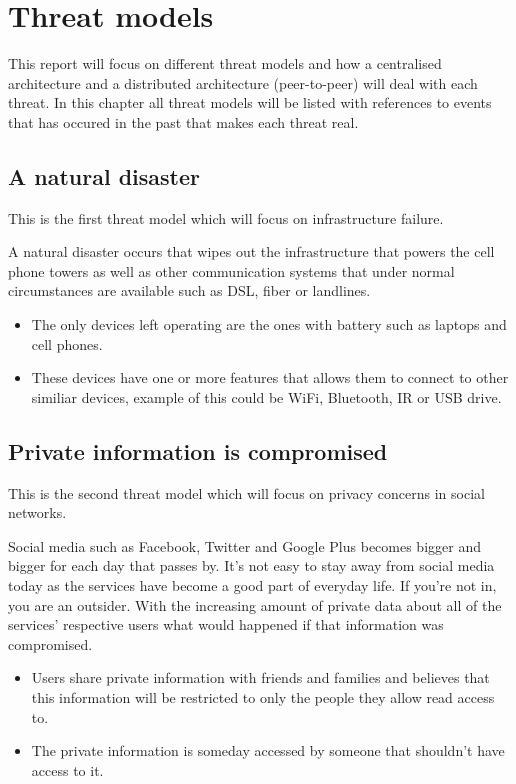 \section{Threat models}
This report will focus on different threat models and how a centralised architecture and a distributed architecture (peer-to-peer) will deal with each threat.
In this chapter all threat models will be listed with references to events that has occured in the past that makes each threat real.

\subsection{A natural disaster}
This is the first threat model which will focus on infrastructure failure.

A natural disaster occurs that wipes out the infrastructure that powers the cell phone towers as well as other communication systems that under normal circumstances are available such as DSL, fiber or landlines.
\begin{itemize}
  \item The only devices left operating are the ones with battery such as laptops and cell phones.
  \item These devices have one or more features that allows them to connect to other similiar devices, example of this could be WiFi, Bluetooth, IR or USB drive.
\end{itemize}

\subsection{Private information is compromised}
This is the second threat model which will focus on privacy concerns in social networks.

Social media such as Facebook, Twitter and Google Plus becomes bigger and bigger for each day that passes by.
It's not easy to stay away from social media today as the services have become a good part of everyday life.
If you're not in, you are an outsider. 
With the increasing amount of private data about all of the services' respective users what would happened if that information was compromised.

\begin{itemize}
  \item Users share private information with friends and families and believes that this information will be restricted to only the people they allow read access to.
  \item The private information is someday accessed by someone that shouldn't have access to it. 
\end{itemize}

